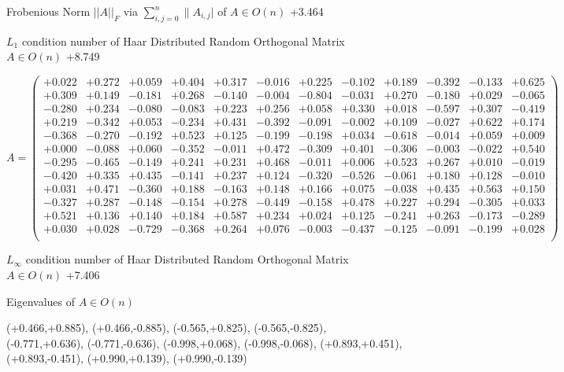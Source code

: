 \documentclass[9pt]{article}
\theoremstyle{plain}
\theoremstyle{definition}
\theoremstyle{remark}
\numberwithin{equation}{section}
\begin{document}
Frobenious Norm  $||A||_{\textit{F}}$ via $\sum\limits_{i,j =0}^{n} \|A_{i,j}|$   of  $A \in O(n)$  +3.464

$L_1$ condition number of Haar Distributed Random Orthogonal Matrix $A \in O(n)$ +8.749

$A = \left(
\begin{array}{
cccccccccccc}
+0.022 & +0.272 & +0.059 & +0.404 & +0.317 & -0.016 & +0.225 & -0.102 & +0.189 & -0.392 & -0.133 & +0.625 \\
+0.309 & +0.149 & -0.181 & +0.268 & -0.140 & -0.004 & -0.804 & -0.031 & +0.270 & -0.180 & +0.029 & -0.065 \\
-0.280 & +0.234 & -0.080 & -0.083 & +0.223 & +0.256 & +0.058 & +0.330 & +0.018 & -0.597 & +0.307 & -0.419 \\
+0.219 & -0.342 & +0.053 & -0.234 & +0.431 & -0.392 & -0.091 & -0.002 & +0.109 & -0.027 & +0.622 & +0.174 \\
-0.368 & -0.270 & -0.192 & +0.523 & +0.125 & -0.199 & -0.198 & +0.034 & -0.618 & -0.014 & +0.059 & +0.009 \\
+0.000 & -0.088 & +0.060 & -0.352 & -0.011 & +0.472 & -0.309 & +0.401 & -0.306 & -0.003 & -0.022 & +0.540 \\
-0.295 & -0.465 & -0.149 & +0.241 & +0.231 & +0.468 & -0.011 & +0.006 & +0.523 & +0.267 & +0.010 & -0.019 \\
-0.420 & +0.335 & +0.435 & -0.141 & +0.237 & +0.124 & -0.320 & -0.526 & -0.061 & +0.180 & +0.128 & -0.010 \\
+0.031 & +0.471 & -0.360 & +0.188 & -0.163 & +0.148 & +0.166 & +0.075 & -0.038 & +0.435 & +0.563 & +0.150 \\
-0.327 & +0.287 & -0.148 & -0.154 & +0.278 & -0.449 & -0.158 & +0.478 & +0.227 & +0.294 & -0.305 & +0.033 \\
+0.521 & +0.136 & +0.140 & +0.184 & +0.587 & +0.234 & +0.024 & +0.125 & -0.241 & +0.263 & -0.173 & -0.289 \\
+0.030 & +0.028 & -0.729 & -0.368 & +0.264 & +0.076 & -0.003 & -0.437 & -0.125 & -0.091 & -0.199 & +0.028 \\
\end{array}
\right)$ \newline 

$L_{\infty}$ condition number of Haar Distributed Random Orthogonal Matrix $A \in O(n)$ +7.406

Eigenvalues of $A \in O(n)$

(+0.466,+0.885), (+0.466,-0.885), (-0.565,+0.825), (-0.565,-0.825), (-0.771,+0.636), (-0.771,-0.636), (-0.998,+0.068), (-0.998,-0.068), (+0.893,+0.451), (+0.893,-0.451), (+0.990,+0.139), (+0.990,-0.139)
\end{document}
